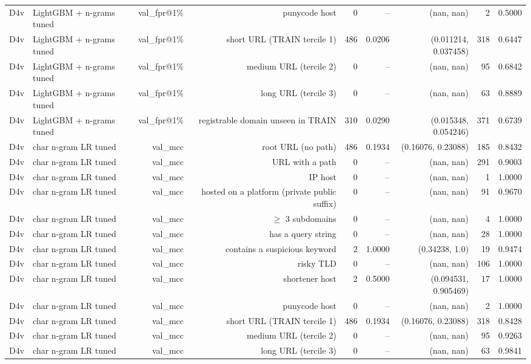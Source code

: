 \begin{table}[t]
\begin{tabular}{llrrrrrrr}
D4v & LightGBM + n-grams tuned & val\_fpr@1\% & punycode host & 0 & -- & (nan, nan) & 2 & 0.5000 \\
D4v & LightGBM + n-grams tuned & val\_fpr@1\% & short URL (TRAIN tercile 1) & 486 & 0.0206 & (0.011214, 0.037458) & 318 & 0.6447 \\
D4v & LightGBM + n-grams tuned & val\_fpr@1\% & medium URL (tercile 2) & 0 & -- & (nan, nan) & 95 & 0.6842 \\
D4v & LightGBM + n-grams tuned & val\_fpr@1\% & long URL (tercile 3) & 0 & -- & (nan, nan) & 63 & 0.8889 \\
D4v & LightGBM + n-grams tuned & val\_fpr@1\% & registrable domain unseen in TRAIN & 310 & 0.0290 & (0.015348, 0.054246) & 371 & 0.6739 \\
D4v & char n-gram LR tuned & val\_mcc & root URL (no path) & 486 & 0.1934 & (0.16076, 0.23088) & 185 & 0.8432 \\
D4v & char n-gram LR tuned & val\_mcc & URL with a path & 0 & -- & (nan, nan) & 291 & 0.9003 \\
D4v & char n-gram LR tuned & val\_mcc & IP host & 0 & -- & (nan, nan) & 1 & 1.0000 \\
D4v & char n-gram LR tuned & val\_mcc & hosted on a platform (private public suffix) & 0 & -- & (nan, nan) & 91 & 0.9670 \\
D4v & char n-gram LR tuned & val\_mcc & $\geq$ 3 subdomains & 0 & -- & (nan, nan) & 4 & 1.0000 \\
D4v & char n-gram LR tuned & val\_mcc & has a query string & 0 & -- & (nan, nan) & 28 & 1.0000 \\
D4v & char n-gram LR tuned & val\_mcc & contains a suspicious keyword & 2 & 1.0000 & (0.34238, 1.0) & 19 & 0.9474 \\
D4v & char n-gram LR tuned & val\_mcc & risky TLD & 0 & -- & (nan, nan) & 106 & 1.0000 \\
D4v & char n-gram LR tuned & val\_mcc & shortener host & 2 & 0.5000 & (0.094531, 0.905469) & 17 & 1.0000 \\
D4v & char n-gram LR tuned & val\_mcc & punycode host & 0 & -- & (nan, nan) & 2 & 1.0000 \\
D4v & char n-gram LR tuned & val\_mcc & short URL (TRAIN tercile 1) & 486 & 0.1934 & (0.16076, 0.23088) & 318 & 0.8428 \\
D4v & char n-gram LR tuned & val\_mcc & medium URL (tercile 2) & 0 & -- & (nan, nan) & 95 & 0.9263 \\
D4v & char n-gram LR tuned & val\_mcc & long URL (tercile 3) & 0 & -- & (nan, nan) & 63 & 0.9841 \\

\end{tabular}
\end{table}
